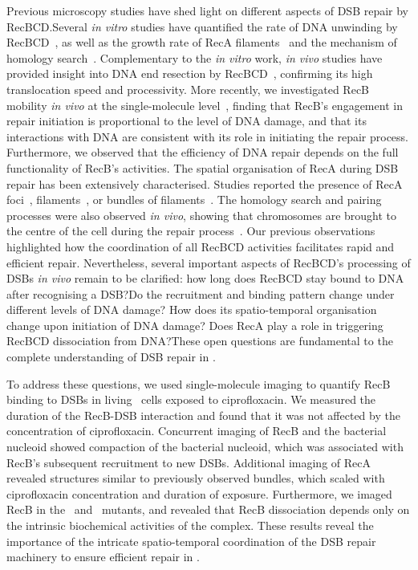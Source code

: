 Previous microscopy studies have shed light on different aspects of DSB repair by RecBCD.\@ Several \emph{in vitro} studies have quantified the rate of DNA unwinding by RecBCD~\cite{Spies2003,Liu2013}, as well as the growth rate of RecA filaments~\cite{Joo2006,Galletto2006,Handa2009} and the mechanism of homology search~\cite{Forget2012,Ragunathan2012}. Complementary to the \emph{in vitro} work, \emph{in vivo} studies have provided insight into DNA end resection by RecBCD~\cite{Wiktor2018}, confirming its high translocation speed and processivity. More recently, we investigated RecB mobility \emph{in vivo} at the single-molecule level~\cite{Lepore2025}, finding that RecB's engagement in repair initiation is proportional to the level of DNA damage, and that its interactions with DNA are consistent with its role in initiating the repair process. Furthermore, we observed that the efficiency of DNA repair depends on the full functionality of RecB's activities. The spatial organisation of RecA during DSB repair has been extensively characterised. Studies reported the presence of RecA foci~\cite{Renzette2005,Renzette2007,Centore2007,Amarh2018}, filaments~\cite{Kidane2005}, or bundles of filaments~\cite{Lesterlin2013,Ghodke2019}. The homology search and pairing processes were also observed \emph{in vivo}, showing that chromosomes are brought to the centre of the cell during the repair process~\cite{Badrinarayanan2015,Wiktor2021}. Our previous observations~\cite{Lepore2025} highlighted how the coordination of all RecBCD activities facilitates rapid and efficient repair. Nevertheless, several important aspects of RecBCD's processing of DSBs \emph{in vivo} remain to be clarified: how long does RecBCD stay bound to DNA after recognising a DSB?\@ Do the recruitment and binding pattern change under different levels of DNA damage? How does its spatio-temporal organisation change upon initiation of DNA damage? Does RecA play a role in triggering RecBCD dissociation from DNA?\@ These open questions are fundamental to the complete understanding of DSB repair in \ecoli.

To address these questions, we used single-molecule imaging to quantify RecB binding to DSBs in living \ecoli\ cells exposed to ciprofloxacin. We measured the duration of the RecB-DSB interaction and found that it was not affected by the concentration of ciprofloxacin. Concurrent imaging of RecB and the bacterial nucleoid showed compaction of the bacterial nucleoid, which was associated with RecB's subsequent recruitment to new DSBs. Additional imaging of  RecA revealed structures similar to previously observed bundles, which scaled with ciprofloxacin concentration and duration of exposure. Furthermore, we imaged RecB in the \dreca\ and \geneteneighty\ mutants, and revealed that RecB dissociation depends only on the intrinsic biochemical activities of the complex. These results reveal the importance of the intricate spatio-temporal coordination of the DSB repair machinery to ensure efficient repair in \ecoli.
